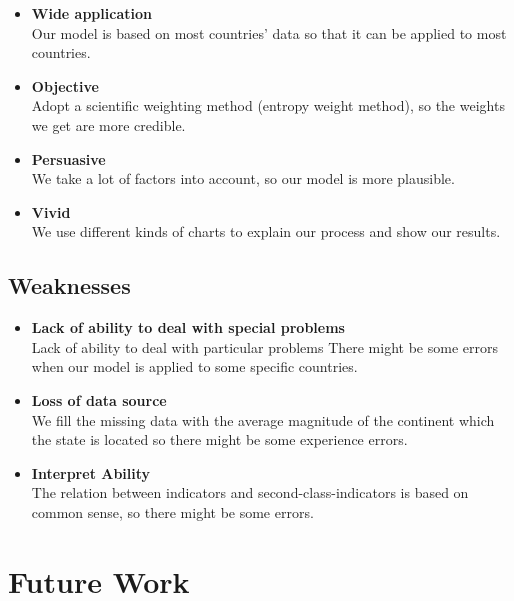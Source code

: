 \documentclass{mcmthesis}
\begin{document}
			\begin{itemize}
				
				\item \textbf{Wide application}\\Our model is based on most countries’ data so that it can be applied to most countries.
				
				\item \textbf{Objective}\\Adopt a scientific weighting method (entropy weight method), so the weights we get are more credible.
				
				\item \textbf{Persuasive}\\We take a lot of factors into account, so our model is more plausible.
				
				\item \textbf{Vivid}\\We use different kinds of charts to explain our process and show our results.
		
			\end{itemize}
		
		\subsection{Weaknesses}
		
			\begin{itemize}
				
				\item \textbf{Lack of ability to deal with special problems}\\Lack of ability to deal with particular problems
				There might be some errors when our model is applied to some specific countries.
				
				\item \textbf{Loss of data source}\\We fill the missing data with the average magnitude of the continent which the state is located so there might be some experience errors.
				
				\item \textbf{Interpret Ability}\\The relation between indicators and second-class-indicators is based on common sense, so there might be some errors. 
				
			\end{itemize}
		
	\section{Future Work}
	
\end{document}

